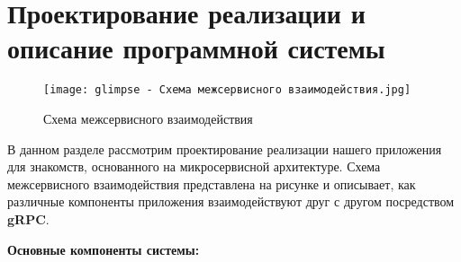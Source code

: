 \section{Проектирование реализации и описание программной системы}


\begin{figure}[h]
    \centering
    \texttt{[image: glimpse - Схема межсервисного взаимодействия.jpg]}
    \caption{Схема межсервисного взаимодействия}
\end{figure}

В данном разделе рассмотрим проектирование реализации нашего приложения для знакомств, основанного на микросервисной архитектуре. Схема межсервисного взаимодействия представлена на рисунке и описывает, как различные компоненты приложения взаимодействуют друг с другом посредством \textbf{gRPC}.

\textbf{Основные компоненты системы:}


